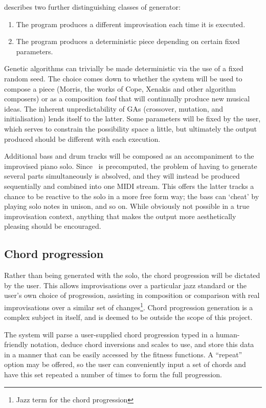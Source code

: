 \cite{morris05} describes two further distinguishing classes of generator:

\begin{enumerate}
	\item The program produces a different improvisation each time it is executed.
	\item The program produces a deterministic piece depending on certain fixed parameters.
\end{enumerate}

Genetic algorithms can trivially be made deterministic via the use of a fixed random seed. The choice comes down to whether the system will be used to compose a piece (Morris, the works of Cope, Xenakis and other algorithm composers) or as a composition \emph{tool} that will continually produce new musical ideas. The inherent unpredictability of GAs (crossover, mutation, and initialisation) lends itself to the latter. Some parameters will be fixed by the user, which serves to constrain the possibility space a little, but ultimately the output produced should be different with each execution.

Additional bass and drum tracks will be composed as an accompaniment to the improvised piano solo. Since \jg\ is precomputed, the problem of having to generate several parts simultaneously is absolved, and they will instead be produced sequentially and combined into one MIDI stream. This offers the latter tracks a chance to be reactive to the solo in a more free form way; the bass can `cheat' by playing solo notes in unison, and so on. While obviously not possible in a true improvisation context, anything that makes the output more aesthetically pleasing should be encouraged.

\subsection{Chord progression}

Rather than being generated with the solo, the chord progression will be dictated by the user. This allows improvisations over a particular jazz standard or the user's own choice of progression, assisting in composition or comparison with real improvisations over a similar set of changes\footnote{Jazz term for the chord progression}. Chord progression generation is a complex subject in itself, and is deemed to be outside the scope of this project.

The system will parse a user-supplied chord progression typed in a human-friendly notation, deduce chord inversions and scales to use, and store this data in a manner that can be easily accessed by the fitness functions. A ``repeat'' option may be offered, so the user can conveniently input a set of chords and have this set repeated a number of times to form the full progression.

